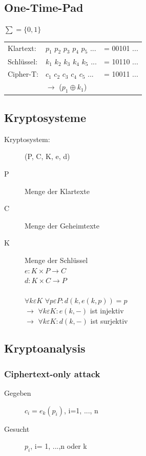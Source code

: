 \documentclass[10pt]{article}
\newcommand{\ra}{\rightarrow}
\begin{document}
\subsection{One-Time-Pad}
$\sum = \{0,1\}$ \\
\begin{tabular}{l l l}
	Klartext: & $p_1$ $p_2$ $p_3$ $p_4$ $p_5$ ... & = 00101 ...  \\
	Schlüssel: & $k_1$ $k_2$ $k_3$ $k_4$ $k_5$ ... & = 10110 ... \\
	Cipher-T: & $c_1$ $c_2$ $c_3$ $c_4$ $c_5$ ... & = 10011 ... \\
	& $\ra$ ($p_1 \oplus k_1$)
\end{tabular}

\subsection{Kryptosysteme}
\begin{description}
	\item[Kryptosystem:] (P, C, K, e, d)
	\item[P] Menge der {\color{blue}Klartexte}
	\item[C] Menge der {\color{red}Geheimtexte}
	\item[K] Menge der Schlüssel \\
		$e:K\times P \ra C$ \\
		$d:K\times C \ra P$ \\ \\
		$\forall k \varepsilon K$ $\forall p \varepsilon P: d( k, e (k,p))=p$ \\
		$\ra$ $\forall k \varepsilon K : e (k,-)$ ist {\color{blue}injektiv} \\
		$\ra$ $\forall k \varepsilon K : d (k,-)$ ist {\color{red}surjektiv} \\
\end{description}

\subsection{Kryptoanalysis}
\subsubsection{Ciphertext-only attack}
\begin{description}
	\item[Gegeben] $c_i=e_k(p_i)$, i=1, ..., n
	\item[Gesucht] $p_i$, i= 1, ...,n oder k
\end{description}
\end{document}
